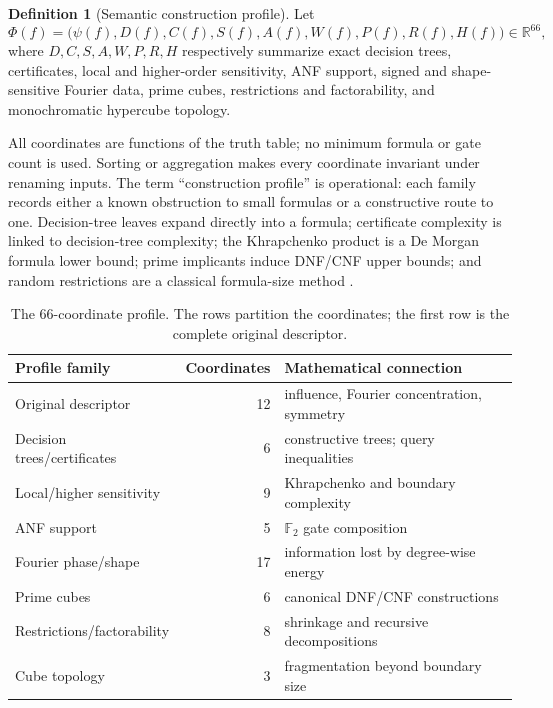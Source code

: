 \documentclass[10pt]{article}
\theoremstyle{definition}
\newtheorem{definition}[proposition]{Definition}
\begin{document}
\begin{definition}[Semantic construction profile]
Let
\[
 \Phi(f)=\bigl(\psi(f),D(f),C(f),S(f),A(f),W(f),P(f),R(f),H(f)\bigr)
 \in\mathbb R^{66},                                                   \tag{2}
\]
where $D,C,S,A,W,P,R,H$ respectively summarize exact decision trees,
certificates, local and higher-order sensitivity, ANF support, signed and
shape-sensitive Fourier data, prime cubes, restrictions and factorability,
and monochromatic hypercube topology.
\end{definition}

All coordinates are functions of the truth table; no minimum formula or gate
count is used.  Sorting or aggregation makes every coordinate invariant under
renaming inputs.  The term ``construction profile'' is operational: each
family records either a known obstruction to small formulas or a constructive
route to one.  Decision-tree leaves expand directly into a formula; certificate
complexity is linked to decision-tree complexity; the Khrapchenko product is a
De Morgan formula lower bound; prime implicants induce DNF/CNF upper bounds;
and random restrictions are a classical formula-size method
\cite{jukna2012,buhrman2002,impagliazzo1993,chandra1978}.

\begin{table}[!htbp]
\centering\small
\begin{tabular}{lrl}
\toprule
Profile family & Coordinates & Mathematical connection \\
\midrule
Original descriptor & 12 & influence, Fourier concentration, symmetry \\
Decision trees/certificates & 6 & constructive trees; query inequalities \\
Local/higher sensitivity & 9 & Khrapchenko and boundary complexity \\
ANF support & 5 & $\mathbb F_2$ gate composition \\
Fourier phase/shape & 17 & information lost by degree-wise energy \\
Prime cubes & 6 & canonical DNF/CNF constructions \\
Restrictions/factorability & 8 & shrinkage and recursive decompositions \\
Cube topology & 3 & fragmentation beyond boundary size \\
\bottomrule
\end{tabular}
\caption{The 66-coordinate profile.  The rows partition the coordinates; the
first row is the complete original descriptor.}
\label{tab:profile}
\end{table}
\end{document}

